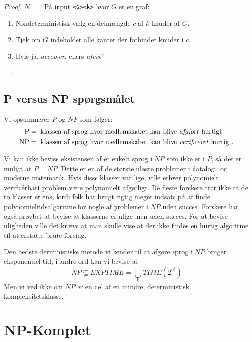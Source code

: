 \begin{proof}
  $N = $ ``På input \texttt{<G><k>} hvor $G$ er en graf:
  \begin{enumerate}
    \item Nondeterministisk vælg en delmængde $c$ af $k$ knuder af $G$.
    \item Tjek om $G$ indeholder alle kanter der forbinder knuder i $c$.
    \item Hvis ja, \textit{accepter}, ellers \textit{afvis}.''
  \end{enumerate}
\end{proof}

\subsection{P versus NP spørgsmålet}%
\label{subsec:pvsnp}

Vi opsummerer $P$ og $NP$ som følger:
\begin{align*}
\text{P} &= \text{ klassen af sprog hvor medlemskabet kan blive \textit{afgjort} hurtigt.} \\
  \text{NP} &= \text{ klassen af sprog hvor medlemskabet kan blive \textit{verificeret} hurtigt.}
\end{align*}

Vi kan ikke bevise eksistensen af et enkelt sprog i $NP$ som ikke er i $P$, så det er muligt at $P = NP$. Dette er en af de største uløste problemer i datalogi, og moderne matematik. Hvis disse klasser var lige, ville ethver polynomielt verificérbart problem være polynomielt afgørligt. De fleste forskere tror ikke at de to klasser er ens, fordi folk har brugt rigtig meget indsats  på at finde polynomieltidsalgoritme for nogle af problemer i $NP$ uden succes. Forskere har også prøvbet at bevise at klasserne er ulige men uden succes. For at bevise uligheden ville det kræve at man skulle vise at der ikke findes en hurtig algoritme til at erstatte brute-forcing.

Den bedste derministiske metode vi kender til at afgøre sprog i $NP$ bruger eksponentiel tid, i andre ord kan vi bevise at
\begin{equation*}
NP \subseteq EXPTIME = \bigcup_{k} TIME (2^{n^{k}})
\end{equation*}
Men vi ved ikke om $NP$ er en del af en mindre, deterministisk kompleksitetsklasse.

\section{NP-Komplet}%
\label{sec:npcompleteness}

